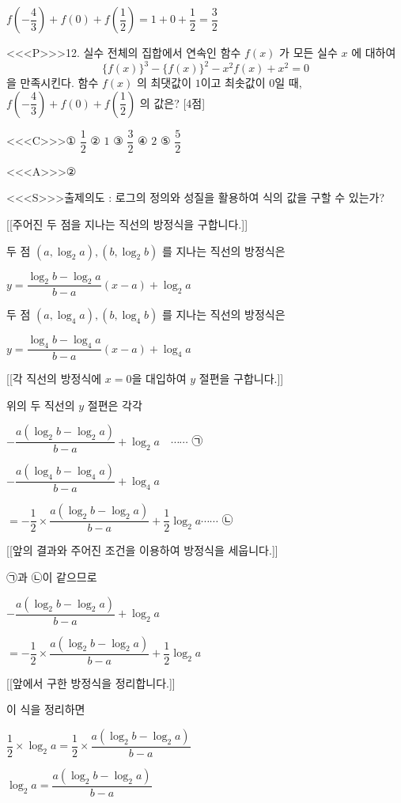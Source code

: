 \documentclass{oblivoir}
\begin{document}
$f\left(-\dfrac{4}{3}\right)+f(0)+f\left(\dfrac{1}{2}\right)=1+0+\dfrac{1}{2}=\dfrac{3}{2}$

<<<P>>>12. 실수 전체의 집합에서 연속인 함수 $f(x)$ 가 모든 실수 $x$ 에 대하여
$$
\{f(x)\}^{3}-\{f(x)\}^{2}-x^{2} f(x)+x^{2}=0
$$
을 만족시킨다. 함수 $f(x)$ 의 최댓값이 $1$이고 최솟값이 $0$일 때, $f\left(-\dfrac{4}{3}\right)+f(0)+f\left(\dfrac{1}{2}\right)$ 의 값은? [4점]

<<<C>>>① $\dfrac{1}{2}$
② $1$
③ $\dfrac{3}{2}$
④ $2$
⑤ $\dfrac{5}{2}$

<<<A>>>②

<<<S>>>출제의도 : 로그의 정의와 성질을 활용하여 식의 값을 구할 수 있는가?

[[주어진 두 점을 지나는 직선의 방정식을 구합니다.]]

두 점 $\left(a, \log _{2} a\right),\left(b, \log _{2} b\right)$ 를 지나는 직선의 방정식은

$y=\dfrac{\log _{2} b-\log _{2} a}{b-a}(x-a)+\log _{2} a $

두 점 $\left(a, \log _{4} a\right),\left(b, \log _{4} b\right)$ 를 지나는 직선의 방정식은

$y=\dfrac{\log _{4} b-\log _{4} a}{b-a}(x-a)+\log _{4} a $



[[각 직선의 방정식에 $x=0$을 대입하여 $y$ 절편을 구합니다.]]

위의 두 직선의 $y$ 절편은 각각

$-\dfrac{a\left(\log _{2} b-\log _{2} a\right)}{b-a}+\log _{2} a \quad \cdots \cdots$ ㉠

$-\dfrac{a\left(\log _{4} b-\log _{4} a\right)}{b-a}+\log _{4} a$

$=-\dfrac{1}{2} \times \dfrac{a\left(\log _{2} b-\log _{2} a\right)}{b-a}+\dfrac{1}{2} \log _{2} a \cdots \cdots $ ㉡

[[앞의 결과와 주어진 조건을 이용하여 방정식을 세웁니다.]]

㉠과 ㉡이 같으므로

$-\dfrac{a\left(\log _{2} b-\log _{2} a\right)}{b-a}+\log _{2} a$

$=-\dfrac{1}{2} \times \dfrac{a\left(\log _{2} b-\log _{2} a\right)}{b-a}+\dfrac{1}{2} \log _{2} a$

[[앞에서 구한 방정식을 정리합니다.]]

이 식을 정리하면

$\dfrac{1}{2} \times \log _{2} a=\dfrac{1}{2} \times \dfrac{a\left(\log _{2} b-\log _{2} a\right)}{b-a}$

$\log _{2} a=\dfrac{a\left(\log _{2} b-\log _{2} a\right)}{b-a}$
\end{document}
